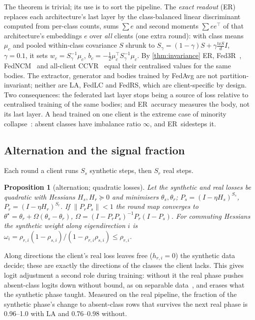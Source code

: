 \documentclass[10pt]{article}
\theoremstyle{plain}
\newtheorem{proposition}[theorem]{Proposition}
\theoremstyle{definition}
\newcommand{\ER}{\textsc{ER}}
\begin{document}
The theorem is trivial; its use is to sort the pipeline. The \emph{exact readout} (\ER) replaces each architecture's
last layer by the class-balanced linear discriminant computed from per-class counts, sums $\sum e$ and second moments
$\sum ee^\top$ of that architecture's embeddings $e$ over \emph{all} clients (one extra round): with class means $\mu_c$
and pooled within-class covariance $S$ shrunk to $S_\gamma=(1-\gamma)S+\gamma\frac{\mathrm{tr}S}{d}I$, $\gamma=0.1$,
it sets $w_c=S_\gamma^{-1}\mu_c$, $b_c=-\frac12\mu_c^\top S_\gamma^{-1}\mu_c$. By \cref{thm:invariance} \ER, Fed3R~\cite{fani2024fed3r},
FedNCM~\cite{legate2023fedncm} and all-client CCVR~\cite{luo2021ccvr} equal their centralised values for the same
bodies. The extractor, generator and bodies trained by FedAvg are not partition-invariant; neither are LA, FedLC and
FedRS, which are client-specific by design. Two consequences: the federated last layer stops being a source of loss
relative to centralised training of the same bodies; and \ER\ accuracy measures the body, not its last layer. A head
trained on one client is the extreme case of minority collapse~\cite{fang2021}: absent classes have imbalance ratio
$\infty$, and \ER\ sidesteps it.

\subsection{Alternation and the signal fraction}\label{sec:signal}

Each round a client runs $S_s$ synthetic steps, then $S_r$ real steps.
\begin{proposition}[alternation; quadratic losses]\label{prop:alternation}
Let the synthetic and real losses be quadratic with Hessians $H_s,H_r\succeq0$ and minimisers $\theta_s,\theta_r$;
$P_s=(I-\eta H_s)^{S_s}$, $P_r=(I-\eta H_r)^{S_r}$. If $\|P_rP_s\|<1$ the round map converges to
$\theta^\star=\theta_r+\Omega(\theta_s-\theta_r)$, $\Omega=(I-P_rP_s)^{-1}P_r(I-P_s)$. For commuting Hessians the
synthetic weight along eigendirection $i$ is $\omega_i=\rho_{r,i}(1-\rho_{s,i})/(1-\rho_{r,i}\rho_{s,i})\le\rho_{r,i}$.
\end{proposition}
Along directions the client's real loss leaves free ($h_{r,i}=0$) the synthetic data decide; these are exactly the
directions of the classes the client lacks. This gives logit adjustment a second role during training: without it the
real phase pushes absent-class logits down without bound, as on separable data~\cite{soudry2018}, and erases what the
synthetic phase taught. Measured on the real pipeline, the fraction of the synthetic phase's change to absent-class rows
that survives the next real phase is 0.96--1.0 with LA and 0.76--0.98 without.
\end{document}
